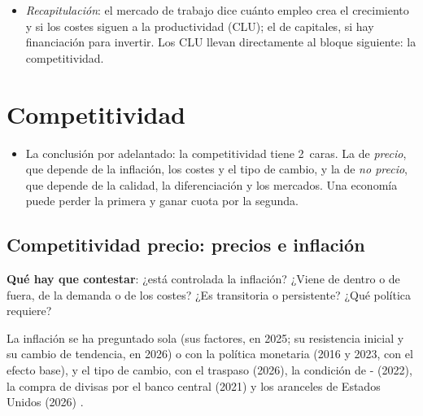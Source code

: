 \documentclass[11pt]{article}
\begin{document}
\begin{itemize}
\item \emph{Recapitulación}: el mercado de trabajo dice cuánto empleo crea el crecimiento y si los costes siguen a la productividad (CLU); el de capitales, si hay financiación para invertir. Los CLU llevan directamente al bloque siguiente: la competitividad.
\end{itemize}


\section{Competitividad}\label{sec:competitividad}

\begin{itemize}
\item La conclusión por adelantado: la competitividad tiene 2~caras. La de \emph{precio}, que depende de la inflación, los costes y el tipo de cambio, y la de \emph{no precio}, que depende de la calidad, la diferenciación y los mercados. Una economía puede perder la primera y ganar cuota por la segunda.
\end{itemize}

\subsection{Competitividad precio: precios e inflación}\label{sec:precios}

\begin{ideaclave}
\textbf{Qué hay que contestar}: ¿está controlada la inflación? ¿Viene de dentro o de fuera, de la demanda o de los costes? ¿Es transitoria o persistente? ¿Qué política requiere?
\end{ideaclave}

\begin{notaopositor}
La inflación se ha preguntado sola (sus factores, en 2025; su resistencia inicial y su cambio de tendencia, en 2026) o con la política monetaria (2016 y 2023, con el efecto base), y el tipo de cambio, con el traspaso (2026), la condición de - (2022), la compra de divisas por el banco central (2021) y los aranceles de Estados Unidos (2026) \parencite{ATCEE2026Examenes}.
\end{notaopositor}
\end{document}

